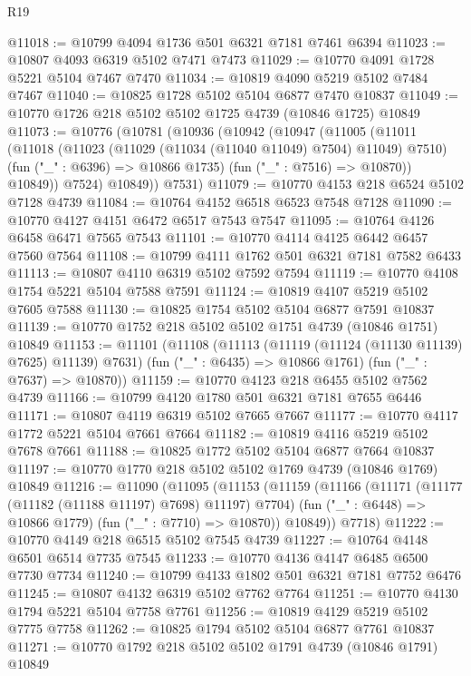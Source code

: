 \begin{lexlean}{R19}
\begin{coremodule}
{{{{{{{{{{{@11018 := @10799 @4094 @1736 @501 @6321 @7181 @7461 @6394
@11023 := @10807 @4093 @6319 @5102 @7471 @7473
@11029 := @10770 @4091 @1728 @5221 @5104 @7467 @7470
@11034 := @10819 @4090 @5219 @5102 @7484 @7467
@11040 := @10825 @1728 @5102 @5104 @6877 @7470 @10837
@11049 := @10770 @1726 @218 @5102 @5102 @1725 @4739 (@10846 @1725) @10849
@11073 := @10776
    (@10781
      (@10936
        (@10942
          (@10947
            (@11005
              (@11011
                (@11018
                  (@11023 (@11029 (@11034 (@11040 @11049) @7504) @11049) @7510)
                  (fun ("_" : @6396) => @10866 @1735)
                  (fun ("_" : @7516) => @10870))
                @10849))
            @7524)
          @10849))
      @7531)
@11079 := @10770 @4153 @218 @6524 @5102 @7128 @4739
@11084 := @10764 @4152 @6518 @6523 @7548 @7128
@11090 := @10770 @4127 @4151 @6472 @6517 @7543 @7547
@11095 := @10764 @4126 @6458 @6471 @7565 @7543
@11101 := @10770 @4114 @4125 @6442 @6457 @7560 @7564
@11108 := @10799 @4111 @1762 @501 @6321 @7181 @7582 @6433
@11113 := @10807 @4110 @6319 @5102 @7592 @7594
@11119 := @10770 @4108 @1754 @5221 @5104 @7588 @7591
@11124 := @10819 @4107 @5219 @5102 @7605 @7588
@11130 := @10825 @1754 @5102 @5104 @6877 @7591 @10837
@11139 := @10770 @1752 @218 @5102 @5102 @1751 @4739 (@10846 @1751) @10849
@11153 := @11101
    (@11108
      (@11113 (@11119 (@11124 (@11130 @11139) @7625) @11139) @7631)
      (fun ("_" : @6435) => @10866 @1761)
      (fun ("_" : @7637) => @10870))
@11159 := @10770 @4123 @218 @6455 @5102 @7562 @4739
@11166 := @10799 @4120 @1780 @501 @6321 @7181 @7655 @6446
@11171 := @10807 @4119 @6319 @5102 @7665 @7667
@11177 := @10770 @4117 @1772 @5221 @5104 @7661 @7664
@11182 := @10819 @4116 @5219 @5102 @7678 @7661
@11188 := @10825 @1772 @5102 @5104 @6877 @7664 @10837
@11197 := @10770 @1770 @218 @5102 @5102 @1769 @4739 (@10846 @1769) @10849
@11216 := @11090
    (@11095
      (@11153
        (@11159
          (@11166
            (@11171 (@11177 (@11182 (@11188 @11197) @7698) @11197) @7704)
            (fun ("_" : @6448) => @10866 @1779)
            (fun ("_" : @7710) => @10870))
          @10849))
      @7718)
@11222 := @10770 @4149 @218 @6515 @5102 @7545 @4739
@11227 := @10764 @4148 @6501 @6514 @7735 @7545
@11233 := @10770 @4136 @4147 @6485 @6500 @7730 @7734
@11240 := @10799 @4133 @1802 @501 @6321 @7181 @7752 @6476
@11245 := @10807 @4132 @6319 @5102 @7762 @7764
@11251 := @10770 @4130 @1794 @5221 @5104 @7758 @7761
@11256 := @10819 @4129 @5219 @5102 @7775 @7758
@11262 := @10825 @1794 @5102 @5104 @6877 @7761 @10837
@11271 := @10770 @1792 @218 @5102 @5102 @1791 @4739 (@10846 @1791) @10849
}}}}}}}}}}}
\end{coremodule}
\end{lexlean}
